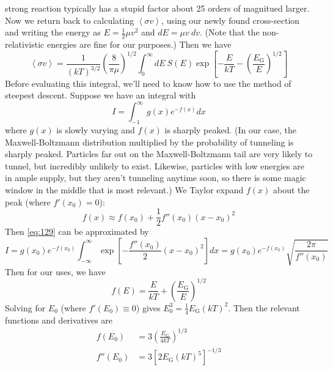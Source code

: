 \documentclass[10pt]{article}
\numberwithin{equation}{section}
\newcommand{\avg}[1]{\left\langle#1\right\rangle}
\begin{document}
  strong reaction typically has a stupid factor about 25 orders of
  magnitued larger. Now we return back
  to calculating $\avg{\sigma v}$, using our newly found cross-section
  and writing the energy as $E=\frac{1}{2}\mu v^2$ and $dE=\mu v\
  dv$. (Note that the non-relativistic energies are fine for our
  purposes.) Then we have
  \begin{equation}
    \label{eq:128}
    \avg{\sigma
      v}=\frac{1}{(kT)^{3/2}}\left(\frac{8}{\pi\mu}\right)^{1/2}\int_0^
\infty
    dE\ S(E)\exp\left[-\frac{E}{kT}-\left(\frac{E_\mathrm{G}}{E}\right)^
{1/2}\right]
  \end{equation}
  Before evaluating this integral, we'll need to know how to use the
  method of steepest descent. Suppose we have an integral with
  \begin{equation}
    \label{eq:129}
    I=\int_{-1}^{\infty}g(x)e^{-f(x)}dx
  \end{equation}
  where $g(x)$ is slowly varying and $f(x)$ is sharply peaked. (In our
  case, the Maxwell-Boltzmann distribution multiplied by the
  probability of tunneling is sharply peaked. Particles far out on the
  Maxwell-Boltzmann tail are very likely to tunnel, but incredibly
  unlikely to exist. Likewise, particles with low energies are in
  ample supply, but they aren't tunneling anytime soon, so there is
  some magic window in the middle that is most relevant.) We Taylor
  expand $f(x)$ about the peak (where $f'(x_0)=0$):
  \begin{equation}
    \label{eq:130}
    f(x)\approx f(x_0)+\frac{1}{2}f''(x_0)(x-x_0)^2
  \end{equation}
  Then \eqref{eq:129} can be approximated by
  \begin{equation}
    \label{eq:131}
    I=g(x_0)e^{-f(x_0)}\int_{-\infty}^{\infty}\exp\left[-\frac{f''(x_0)}{2}
(x-x_0)^2\right]dx=g(x_0)e^{-f(x_0)}\sqrt{\frac{2\pi}{f''(x_0)}}
  \end{equation}
  Then for our uses, we have
  \begin{equation}
    \label{eq:132}
    f(E)=\frac{E}{kT}+\left(\frac{E_{\mathrm{G}}}{E}\right)^{1/2}
  \end{equation}
  Solving for $E_0$ (where $f'(E_0)\equiv 0$) gives
  $E_0^3=\frac{1}{4}E_{\mathrm{G}}(kT)^2$. Then the relevant functions
  and derivatives are
  \begin{align}
    \label{eq:133}
    f(E_0)&=3\left(\frac{E_{\mathrm{G}}}{4kT}\right)^{1/3}\\
    \label{eq:133a}
    f''(E_0)&=3\left[2E_{\mathrm{G}}(kT)^5\right]^{-1/3}
  \end{align}
\end{document}
